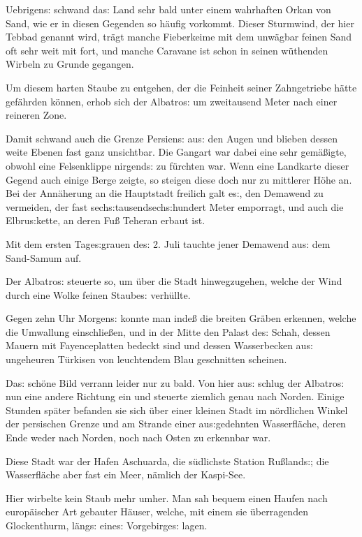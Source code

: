 \documentclass[oneside,12pt]{book}
\newcommand{\s}{s:}
\begin{document}
Uebrigen{\s} schwand da{\s} Land sehr bald unter einem wahrhaften
Orkan von Sand, wie er in diesen Gegenden so h\"aufig vorkommt.
Dieser Sturmwind, der hier {\glqq}Tebbad{\grqq} genannt wird, tr\"agt
manche Fieberkeime mit dem unw\"agbar feinen Sand oft sehr weit mit
fort, und manche Caravane ist schon in seinen w\"uthenden Wirbeln zu
Grunde gegangen.

Um diesem harten Staube zu entgehen, der die Feinheit seiner
Zahngetriebe h\"atte gef\"ahrden k\"onnen, erhob sich der
{\glqq}Albatro{\s}{\grqq} um zweitausend Meter nach einer reineren
Zone.

Damit schwand auch die Grenze Persien{\s} au{\s} den Augen und
blieben dessen weite Ebenen fast ganz unsichtbar. Die Gangart war
dabei eine sehr gem\"a{\ss}igte, obwohl eine Felsenklippe nirgend{\s}
zu f\"urchten war. Wenn eine Landkarte dieser Gegend auch einige
Berge zeigte, so steigen diese doch nur zu mittlerer H\"ohe an. Bei
der Ann\"aherung an die Hauptstadt freilich galt e{\s}, den Demawend
zu vermeiden, der fast sech{\s}tausendsech{\s}hundert Meter
emporragt, und auch die Elbru{\s}kette, an deren Fu{\ss} Teheran
erbaut ist.

Mit dem ersten Tage{\s}grauen de{\s} 2. Juli tauchte jener Demawend
au{\s} dem Sand-Samum auf.

Der {\glqq}Albatro{\s}{\grqq} steuerte so, um \"uber die Stadt
hinwegzugehen, welche der Wind durch eine Wolke feinen Staube{\s}
verh\"ullte.

Gegen zehn Uhr Morgen{\s} konnte man inde{\ss} die breiten Gr\"aben
erkennen, welche die Umwallung einschlie{\ss}en, und in der Mitte den
Palast de{\s} Schah, dessen Mauern mit Fayenceplatten bedeckt sind
und dessen Wasserbecken au{\s} ungeheuren T\"urkisen von leuchtendem
Blau geschnitten scheinen.

Da{\s} sch\"one Bild verrann leider nur zu bald. Von hier au{\s}
schlug der {\glqq}Albatro{\s}{\grqq} nun eine andere Richtung ein und
steuerte ziemlich genau nach Norden. Einige Stunden sp\"ater befanden
sie sich \"uber einer kleinen Stadt im n\"ordlichen Winkel der
persischen Grenze und am Strande einer au{\s}gedehnten
Wasserfl\"ache, deren Ende weder nach Norden, noch nach Osten zu
erkennbar war.

Diese Stadt war der Hafen Aschuarda, die s\"udlichste Station
Ru{\ss}land{\s}; die Wasserfl\"ache aber fast ein Meer, n\"amlich der
Kaspi-See.

Hier wirbelte kein Staub mehr umher. Man sah bequem einen Haufen nach
europ\"aischer Art gebauter H\"auser, welche, mit einem sie
\"uberragenden Glockenthurm, l\"ang{\s} eine{\s} Vorgebirge{\s}
lagen.
\end{document}
